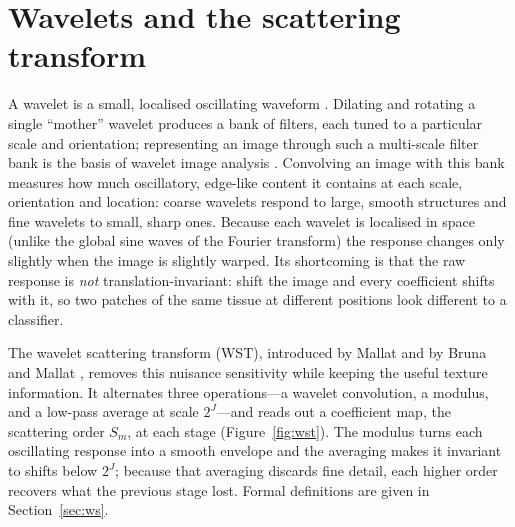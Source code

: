 \section{Wavelets and the scattering transform} \label{sec:wst-bg}

A wavelet is a small, localised oscillating waveform \cite{morlet1982wave}. Dilating and rotating a single ``mother'' wavelet produces a bank of filters, each tuned to a particular scale and orientation; representing an image through such a multi-scale filter bank is the basis of wavelet image analysis \cite{mallat1989theory}. Convolving an image with this bank measures how much oscillatory, edge-like content it contains at each scale, orientation and location: coarse wavelets respond to large, smooth structures and fine wavelets to small, sharp ones. Because each wavelet is localised in space (unlike the global sine waves of the Fourier transform) the response changes only slightly when the image is slightly warped. Its shortcoming is that the raw response is \emph{not} translation-invariant: shift the image and every coefficient shifts with it, so two patches of the same tissue at different positions look different to a classifier.

The wavelet scattering transform (WST), introduced by Mallat and by Bruna and Mallat \cite{mallat2012invariant, bruna2013invariant}, removes this nuisance sensitivity while keeping the useful texture information. It alternates three operations---a wavelet convolution, a modulus, and a low-pass average at scale $2^J$---and reads out a coefficient map, the scattering order $S_m$, at each stage (Figure~\ref{fig:wst}). The modulus turns each oscillating response into a smooth envelope and the averaging makes it invariant to shifts below $2^J$; because that averaging discards fine detail, each higher order recovers what the previous stage lost. Formal definitions are given in Section~\ref{sec:ws}.

